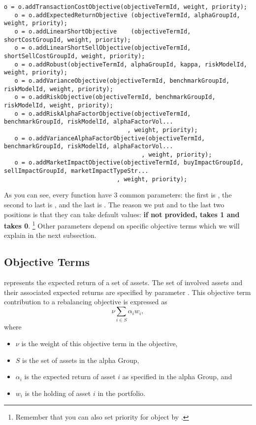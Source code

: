 \begin{lstlisting}[numbers=none]
   o = o.addTransactionCostObjective(objectiveTermId, weight, priority);
   o = o.addExpectedReturnObjective (objectiveTermId, alphaGroupId, weight, priority);
   o = o.addLinearShortObjective    (objectiveTermId, shortCostGroupId, weight, priority);
   o = o.addLinearShortSellObjective(objectiveTermId, shortSellCostGroupId, weight, priority);
   o = o.addRobust(objectiveTermId, alphaGroupId, kappa, riskModelId, weight, priority);
   o = o.addVarianceObjective(objectiveTermId, benchmarkGroupId, riskModelId, weight, priority);
   o = o.addRiskObjective(objectiveTermId, benchmarkGroupId, riskModelId, weight, priority);
   o = o.addRiskAlphaFactorObjective(objectiveTermId, benchmarkGroupId, riskModelId, alphaFactorVol...
                                   , weight, priority);
   o = o.addVarianceAlphaFactorObjective(objectiveTermId, benchmarkGroupId, riskModelId, alphaFactorVol...
                                       , weight, priority);
   o = o.addMarketImpactObjective(objectiveTermId, buyImpactGroupId, sellImpactGroupId, marketImpactTypeStr...
                                , weight, priority);
\end{lstlisting}

As you can see, every function have 3 common parameters: the first is ,
the second to last is , and the last is .
The reason we put  and  to the last two positions is that
they can take default values: \textbf{if not provided,  takes 1 and  takes 0}.
\footnote{Remember that you can also set priority for  object by 
  .}
Other parameters depend on specific objective terms which we will explain in the next subsection.

\subsection{Objective Terms}

     represents the expected return of a set of assets. 
     The set of involved assets and their associated expected returns are specified by parameter . 
     This objective term contribution to a rebalancing objective is expressed as 
     \[
        \nu \sum_{i\in S} \alpha_i w_i,
     \]
     where
     \begin{itemize}
		  \item $\nu$ is the weight of this objective term in the objective, 
		  \item $S$ is the set of assets in the alpha Group, 
		  \item $\alpha_i$ is the expected return of asset $i$ as specified in the alpha Group, and 
		  \item $w_i$ is the holding of asset $i$ in the portfolio. 
     \end{itemize}
     
